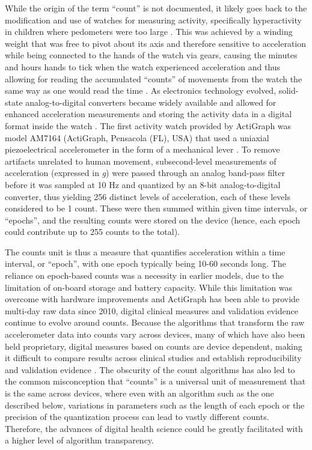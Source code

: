\documentclass{bmcart}
\begin{document}
While the origin of the term “count” is not documented, it likely goes back to
the modification and use of watches for measuring activity, specifically
hyperactivity in children where pedometers were too large
\cite{bell_adaptation_1968, johnson_hyperactivity_1971,maccoby_activity_1965,
	schulman_objective_1959}. This was achieved by a winding weight that was free
to pivot about its axis and therefore sensitive to acceleration while being
connected to the hands of the watch via gears, causing the minutes and hours
hands to tick when the watch experienced acceleration and thus allowing for
reading the accumulated “counts” of movements from the watch the same way as
one would read the time \cite{schulman_objective_1959}. As electronics
technology evolved, solid-state analog-to-digital converters became widely
available and allowed for enhanced acceleration measurements and storing the
activity data in a digital format inside the watch
\cite{redmond_observations_1985, taylor_new_1982, tryon_fully_1996}. The first
activity watch provided by ActiGraph was model AM7164 (ActiGraph, Pensacola
(FL), USA) that used a uniaxial piezoelectrical accelerometer in the form of a
mechanical lever \cite{tryon_fully_1996}. To remove artifacts unrelated to
human movement, subsecond-level measurements of acceleration (expressed in \textit{g})
were passed through an analog band-pass filter before it was sampled at 10 Hz
and quantized by an 8-bit analog-to-digital converter, thus yielding 256
distinct levels of acceleration, each of these levels considered to be 1 count.
These were then summed within given time intervals, or “epochs”, and the
resulting counts were stored on the device (hence, each epoch could contribute
up to 255 counts to the total).

The counts unit is thus a measure that quantifies acceleration within a time
interval, or “epoch”, with one epoch typically being 10-60 seconds long. The
reliance on epoch-based counts was a necessity in earlier models, due to the
limitation of on-board storage and battery capacity. While this limitation was
overcome with hardware improvements and ActiGraph has been able to provide
multi-day raw data since 2010, digital clinical measures and validation
evidence continue to evolve around counts.  Because the algorithms that
transform the raw accelerometer data into counts vary across devices, many of
which have also been held proprietary, digital measures based on counts are
device dependent, making it difficult to compare results across
clinical studies and establish reproducibility and validation evidence
\cite{jul_4_comparing_2001,paul_comparison_2007, straker_translation_2012}. The
obscurity of the count algorithms has also led to the common misconception that
“counts” is a universal unit of measurement that is the same across devices,
where even with an algorithm such as the one described below, variations
in parameters such as the length of each epoch or the precision of the
quantization process can lead to vastly different counts. Therefore, the
advances of digital health science could be greatly facilitated with a higher
level of algorithm transparency.
\end{document}
